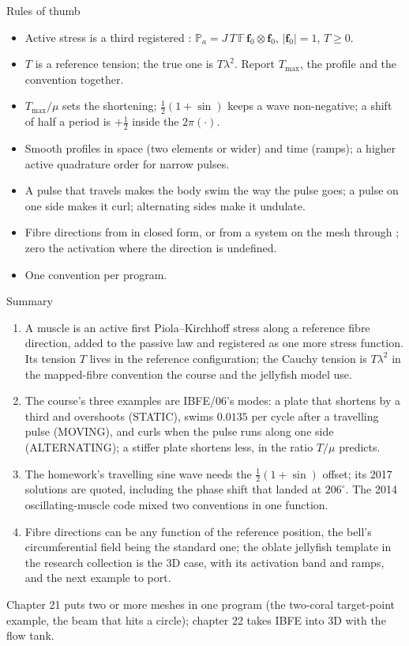 \documentclass[aspectratio=169,11pt]{beamer}
\begin{document}
\begin{frame}{Rules of thumb}
\label{fr:thumb}
\small
\begin{itemize}
  \item Active stress is a third registered : $\mathbb{P}_a = J\,T\,\mathbb{F}\,\mathbf{f}_0\otimes\mathbf{f}_0$, $|\mathbf{f}_0| = 1$, $T \ge 0$.
  \item $T$ is a reference tension; the true one is $T\lambda^2$. Report $T_{\max}$, the profile and the convention together.
  \item $T_{\max}/\mu$ sets the shortening; $\tfrac12(1 + \sin)$ keeps a wave non-negative; a shift of half a period is $+\tfrac12$ inside the $2\pi(\cdot)$.
  \item Smooth profiles in space (two elements or wider) and time (ramps); a higher active quadrature order for narrow pulses.
  \item A pulse that travels makes the body swim the way the pulse goes; a pulse on one side makes it curl; alternating sides make it undulate.
  \item Fibre directions from  in closed form, or from a system on the mesh through ; zero the activation where the direction is undefined.
  \item One convention per program.
\end{itemize}
\end{frame}

\begin{frame}{Summary}
\label{fr:summary}
\footnotesize
\begin{enumerate}
  \item A muscle is an active first Piola--Kirchhoff stress along a reference fibre direction, added to the passive law and registered as one more stress function. Its tension $T$ lives in the reference configuration; the Cauchy tension is $T\lambda^2$ in the mapped-fibre convention the course and the jellyfish model use.
  \item The course's three examples are IBFE/06's modes: a plate that shortens by a third and overshoots (STATIC), swims $0.0135$ per cycle after a travelling pulse (MOVING), and curls when the pulse runs along one side (ALTERNATING); a stiffer plate shortens less, in the ratio $T/\mu$ predicts.
  \item The homework's travelling sine wave needs the $\tfrac12(1 + \sin)$ offset; its 2017 solutions are quoted, including the phase shift that landed at $206^\circ$. The 2014 oscillating-muscle code mixed two conventions in one function.
  \item Fibre directions can be any function of the reference position, the bell's circumferential field being the standard one; the oblate jellyfish template in the research collection is the 3D case, with its activation band and ramps, and the next example to port.
\end{enumerate}
\begin{homebox}
\footnotesize Chapter 21 puts two or more meshes in one program (the two-coral target-point example, the beam that hits a circle); chapter 22 takes IBFE into 3D with the flow tank.
\end{homebox}
\end{frame}
\end{document}
